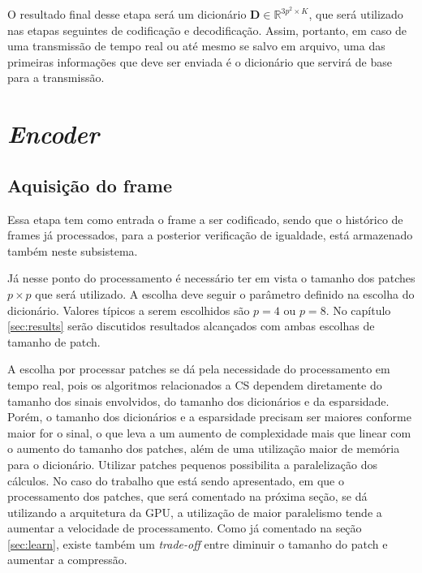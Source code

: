 \documentclass[cic,tc]{iiufrgs}
\newcommand{\mat}[1]{\bm{#1}}
\begin{document}
O resultado final desse etapa será um dicionário $\mat{D} \in \mathbb{R}^{3p^2 \times K}$,
que será utilizado nas etapas seguintes de codificação e decodificação.
Assim, portanto, em caso de uma transmissão de tempo real ou até mesmo se salvo em arquivo,
uma das primeiras informações que deve ser enviada é o dicionário que servirá de base
para a transmissão.


\section{\textit{Encoder}}
\subsection{Aquisição do frame}
\label{sec:frameaquisition}
Essa etapa tem como entrada o frame a ser codificado, sendo que o histórico de frames já
processados, para a posterior verificação de igualdade, está armazenado também neste
subsistema.

Já nesse ponto do processamento é necessário ter em vista o tamanho dos patches $p\times p$
que será utilizado. A escolha deve seguir o parâmetro definido na escolha do dicionário.
Valores típicos a serem escolhidos são $p=4$ ou $p=8$. No capítulo \ref{sec:results} serão 
discutidos resultados alcançados com ambas escolhas de tamanho de patch.

A escolha por processar patches se dá pela necessidade do processamento em tempo real, pois 
os algoritmos relacionados a CS dependem diretamente do tamanho
dos sinais envolvidos, do tamanho dos dicionários e da esparsidade.
Porém, o tamanho dos dicionários e a esparsidade precisam ser maiores conforme maior for 
o sinal, o que leva a um aumento de complexidade mais que linear com o aumento do tamanho dos
patches, além de uma utilização maior de memória para o dicionário.
Utilizar patches pequenos possibilita a paralelização dos cálculos.
No caso do trabalho que está sendo apresentado, em que o processamento dos patches, que será 
comentado na próxima seção, se dá utilizando a arquitetura da GPU, a utilização de maior 
paralelismo tende a aumentar a velocidade de processamento.
Como já comentado na seção \ref{sec:learn}, existe também um \textit{trade-off} entre 
diminuir o tamanho do patch e aumentar a compressão.
\end{document}
